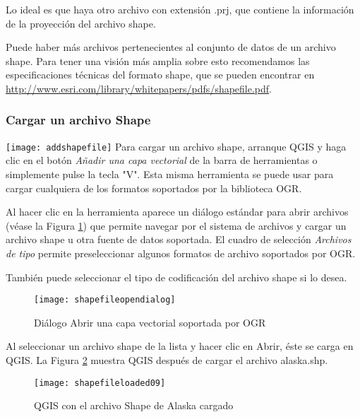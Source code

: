 Lo ideal es que haya otro archivo con extensión .prj, que contiene la información de la proyección del archivo shape.

Puede haber más archivos pertenecientes al conjunto de datos de un archivo shape. Para tener una visión más amplia sobre esto recomendamos las especificaciones técnicas del formato shape, que se pueden encontrar en \url{http://www.esri.com/library/whitepapers/pdfs/shapefile.pdf}.

\subsubsection{Cargar un archivo Shape}\label{sec:load_shapefile}
{\texttt{[image: addshapefile]}} Para cargar un archivo shape, arranque QGIS y haga clic en el botón \textit{Añadir una capa vectorial} de la barra de herramientas o simplemente pulse la tecla "V". Esta misma herramienta se puede usar para cargar cualquiera de los formatos soportados por la biblioteca OGR. 

Al hacer clic en la herramienta aparece un diálogo estándar para abrir archivos (véase la Figura
\ref{fig:openshapefile}) que permite navegar por el sistema de archivos y cargar un archivo shape u otra fuente de datos soportada. El cuadro de selección \textsl{Archivos de tipo} permite preseleccionar algunos formatos de archivo soportados por OGR.

También puede seleccionar el tipo de codificación del archivo shape si lo desea.

\begin{figure}[h]
   \begin{center}
   \caption{Diálogo Abrir una capa vectorial soportada por OGR}\label{fig:openshapefile}\smallskip
   \texttt{[image: shapefileopendialog]}
\end{center} 
\end{figure}

Al seleccionar un archivo shape de la lista y hacer clic en Abrir, éste se carga en QGIS. La Figura
\ref{fig:loadedshapefile} muestra QGIS después de cargar el archivo alaska.shp.

\begin{figure}[ht]
   \begin{center}
   \caption{QGIS con el archivo Shape de Alaska cargado}\label{fig:loadedshapefile}\smallskip
   \texttt{[image: shapefileloaded09]}
\end{center} 
\end{figure}


